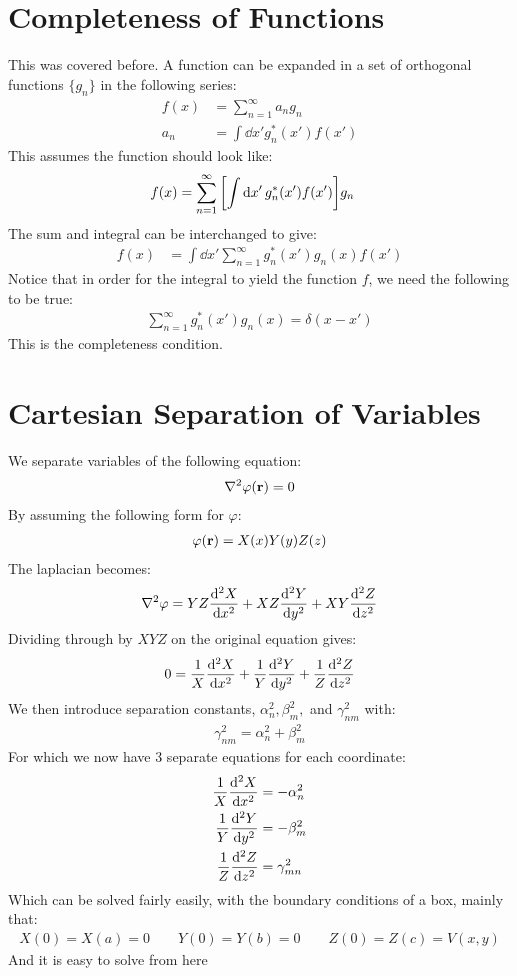 \documentclass[12pt]{article}
\theoremstyle{plain}
\theoremstyle{definition}
\let\temp\phi
\let\phi\varphi
\let\varphi\temp
\begin{document}
\section{Completeness of Functions}
This was covered before. A function can be expanded in a set of orthogonal functions $\{g_n\}$ in the following series:
\begin{align*}
  f(x)&=\sum_{n=1}^\infty a_ng_n\\
  a_n&=\int\dd{x'}g_n^*(x')f(x')
\end{align*}
This assumes the function should look like:
\begin{align*}
  f(x)&=\sum_{n=1}^\infty\qty[\int\dd{x'}g_n^*(x')f(x')]g_n
\end{align*}
The sum and integral can be interchanged to give:
\begin{align*}
  f(x)&=\int\dd{x'}\sum_{n=1}^\infty g_n^*(x')g_n(x)f(x')
\end{align*}
Notice that in order for the integral to yield the function $f$, we need the following to be true:
\begin{align*}
  \boxed{\sum_{n=1}^\infty g_n^*(x')g_n(x)=\delta(x-x')}
\end{align*}
This is the completeness condition.
\section{Cartesian Separation of Variables}
We separate variables of the following equation:
\begin{align*}
  \laplacian{\phi(\vb{r})}=0
\end{align*}
By assuming the following form for $\phi$:
\begin{align*}
  \phi(\vb{r})=X(x)Y(y)Z(z)
\end{align*}
The laplacian becomes:
\begin{align*}
  \laplacian{\phi}=YZ\dv[2]{X}{x}+XZ\dv[2]{Y}{y}+XY\dv[2]{Z}{z}
\end{align*}
Dividing through by $XYZ$ on the original equation gives:
\begin{align*}
  0=\frac1X\dv[2]{X}{x}+\frac1Y\dv[2]{Y}{y}+\frac1Z\dv[2]{Z}{z}
\end{align*}
We then introduce separation constants, $\alpha^2_n,\beta^2_m,$ and $\gamma^2_{nm}$ with:
\begin{align*}
  \gamma^2_{nm}=\alpha_n^2+\beta_m^2
\end{align*}
For which we now have 3 separate equations for each coordinate:
\begin{align*}
  \frac1X\dv[2]{X}{x}&=-\alpha_n^2\\
  \frac1Y\dv[2]{Y}{y}&=-\beta_m^2\\
  \frac1Z\dv[2]{Z}{z}&=\gamma_{mn}^2
\end{align*}
Which can be solved fairly easily, with the boundary conditions of a box, mainly that:
\begin{align*}
  X(0)=X(a)=0\qquad Y(0)=Y(b)=0\qquad Z(0)=Z(c)=V(x,y)
\end{align*}
And it is easy to solve from here
\end{document}
